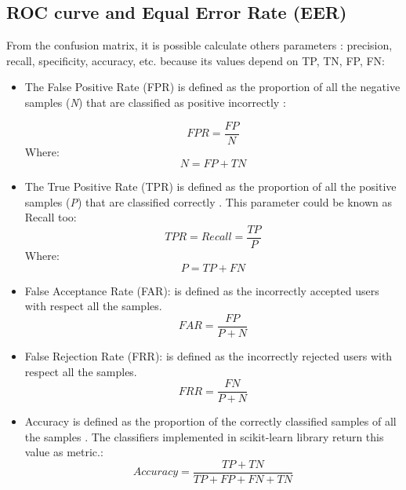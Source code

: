 \subsection{ROC curve and Equal Error Rate (EER)}
From the confusion matrix, it is possible calculate others parameters \cite{Sokolova}: precision, recall, specificity, accuracy, etc. because its values depend on TP, TN, FP, FN:
\begin{itemize}
\item The False Positive Rate (FPR) is defined as the proportion of all the negative samples (\textit{N}) that are classified as positive incorrectly \cite{ROC}:

\begin{equation}
FPR = \frac{FP}{N}
\end{equation}
Where:
 \begin{equation}
  N = FP + TN
\end{equation}

\item The True Positive Rate (TPR) is defined as the proportion of all the positive samples (\textit{P}) that are classified correctly \cite{ROC}. This parameter could be known as Recall too:
\begin{equation}
TPR = Recall = \frac{TP}{P}
\end{equation}
Where:
 \begin{equation}
  P = TP + FN
\end{equation}
\item False Acceptance Rate (FAR): is defined as the incorrectly accepted users with respect all the samples.
\begin{equation}
  FAR = \frac{FP}{P + N}
\end{equation}

\item False Rejection Rate (FRR): is defined as the incorrectly rejected users with respect all the samples.
\begin{equation}
  FRR = \frac{FN}{P + N}
\end{equation}


\item Accuracy is defined as the proportion of the correctly classified samples of all the samples \cite{Sokolova}. The classifiers implemented in scikit-learn library return this value as metric.:
\begin{equation}
  Accuracy = \frac{TP + TN}{TP + FP + FN + TN}
\end{equation}
\end{itemize}

